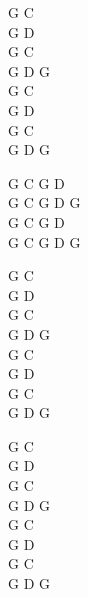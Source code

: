 \begin{chord}
    G C\\
    G D\\
    G C\\
    G D G\\
    G C\\
    G D\\
    G C\\
    G D G

    G C G D\\
    G C G D G\\
    G C G D\\
    G C G D G

    G C\\
    G D\\
    G C\\
    G D G\\
    G C\\
    G D\\
    G C\\
    G D G

    G C\\
    G D\\
    G C\\
    G D G\\
    G C\\
    G D\\
    G C\\
    G D G
\end{chord}